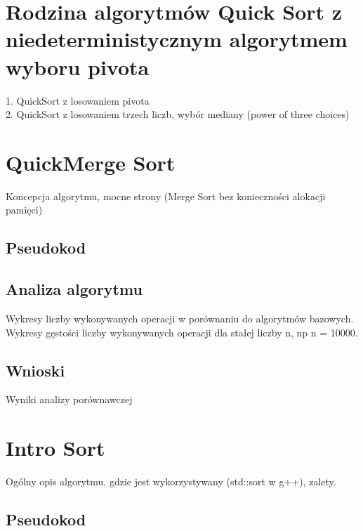 \begin{figure}[H]
	\centering
	
	\caption[]{}
	\label{fig:quick-sort-deterministic-pivot-density}
\end{figure}

\section{Rodzina algorytmów Quick Sort z niedeterministycznym algorytmem wyboru pivota}
1. QuickSort z losowaniem pivota\\
2. QuickSort z losowaniem trzech liczb, wybór mediany (power of three choices)\\

\section{QuickMerge Sort}
Koncepcja algorytmu, mocne strony (Merge Sort bez konieczności alokacji pamięci)

\subsection{Pseudokod}

\subsection{Analiza algorytmu}
Wykresy liczby wykonywanych operacji w porównaniu do algorytmów bazowych.
Wykresy gęstości liczby wykonywanych operacji dla stałej liczby n, np n = 10000.

\subsection{Wnioski}
Wyniki analizy porównawczej


\section{Intro Sort}
Ogólny opis algorytmu, gdzie jest wykorzystywany (std::sort w g++), zalety.
\subsection{Pseudokod}

